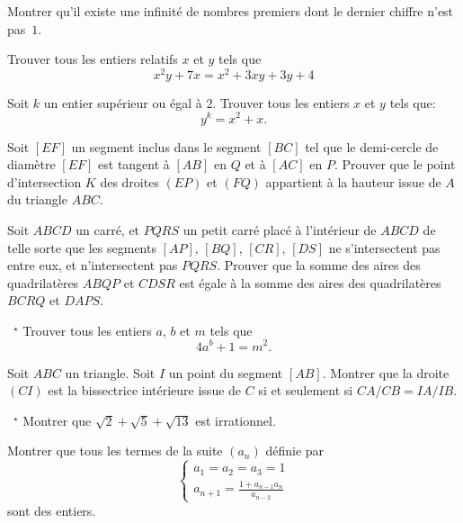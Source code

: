 \begin{exo}{}
Montrer qu'il existe une infinité de nombres premiers dont le dernier chiffre n'est pas~$1$.
\end{exo}

\begin{exo}{}Trouver tous les entiers relatifs $x$ et $y$ tels que \[x^2y+7x=x^2+3xy+3y+4\]
\end{exo}

\begin{exo}{}
Soit $k$ un entier supérieur ou égal à $2$. Trouver tous les entiers $x$ et $y$ tels que: \[ y^k  = x^2 + x.\]
\end{exo}

\begin{exo}{}Soit $[EF]$ un segment inclus dans le segment $[BC]$ tel que le demi-cercle de diamètre $[EF]$ est tangent à $[AB]$ en $Q$ et à $[AC]$ en $P$. Prouver que le point d'intersection $K$ des droites $(EP)$ et $(FQ)$ appartient à la hauteur issue de $A$ du triangle $ABC$.
\end{exo}

\begin{exo}{}
Soit $ABCD$ un carr\'e, et $PQRS$ un petit carr\'e plac\'e \`a l'int\'erieur de $ABCD$ de telle sorte que les segments $[AP]$, $[BQ]$, $[CR]$, $[DS]$ ne s'intersectent pas entre eux, et n'intersectent pas $PQRS$. Prouver que la somme des aires des quadrilat\`eres $ABQP$ et $CDSR$ est \'egale \`a la somme des aires des quadrilat\`eres $BCRQ$ et $DAPS$.
\end{exo}

\begin{exo}{\mbox{ }$^ {\star}$}
Trouver tous les entiers $a$, $b$ et $m$ tels que \[4a^b + 1 = m^2.\]
\end{exo}

\begin{exo}{}Soit $ABC$ un triangle. Soit $I$ un point du segment $[AB]$. Montrer que la droite $(CI)$ est la bissectrice intérieure issue de $C$ si et seulement si $CA/CB=IA/IB$.
\end{exo}

\begin{exo}{\mbox{ }$^ {\star}$}
Montrer que $\sqrt{2}+\sqrt{5}+\sqrt{13}$ est irrationnel.
\end{exo}

\begin{exo}{}Montrer que tous les termes de la suite
$\left(a_{n}\right)$ définie par 
\[
\begin{cases}
a_{1}=a_{2}=a_{3}=1\\
a_{n+1}=\frac{1+a_{n-1}a_{n}}{a_{n-2}}
\end{cases}
\]
sont des entiers. 
\end{exo}

